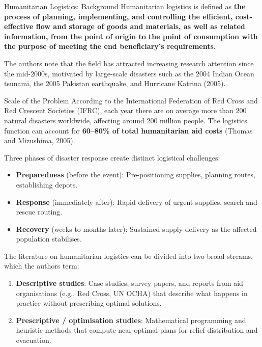 \documentclass[aspectratio=169,10pt]{beamer}
\begin{document}
\begin{frame}[allowframebreaks]{Humanitarian Logistics: Background}
  Humanitarian logistics is defined as \textbf{the process of planning,
  implementing, and controlling the efficient, cost-effective flow and
  storage of goods and materials, as well as related information, from
  the point of origin to the point of consumption with the purpose of
  meeting the end beneficiary's requirements}.

  \medskip
  The authors note that the field has attracted increasing research
  attention since the mid-2000s, motivated by large-scale disasters
  such as the 2004 Indian Ocean tsunami, the 2005 Pakistan earthquake,
  and Hurricane Katrina (2005).

  \medskip
  \begin{block}{Scale of the Problem}
    According to the International Federation of Red Cross and Red
    Crescent Societies (IFRC), each year there are on average more than
    200 natural disasters worldwide, affecting around 200 million people.
    The logistics function can account for \textbf{60--80\% of total
    humanitarian aid costs} (Thomas and Mizushima, 2005).
  \end{block}

  \medskip
  Three phases of disaster response create distinct logistical challenges:
  \begin{itemize}
    \item \textbf{Preparedness} (before the event): Pre-positioning
          supplies, planning routes, establishing depots.
    \item \textbf{Response} (immediately after): Rapid delivery of
          urgent supplies, search and rescue routing.
    \item \textbf{Recovery} (weeks to months later): Sustained supply
          delivery as the affected population stabilises.
  \end{itemize}

  \framebreak

  The literature on humanitarian logistics can be divided into two broad
  streams, which the authors term:
  \begin{enumerate}
    \item \textbf{Descriptive studies}: Case studies, survey papers, and
          reports from aid organisations (e.g., Red Cross, UN OCHA)
          that describe what happens in practice without prescribing
          optimal solutions.
    \item \textbf{Prescriptive / optimisation studies}: Mathematical
          programming and heuristic methods that compute near-optimal
          plans for relief distribution and evacuation.
  \end{enumerate}


\end{frame}
\end{document}
